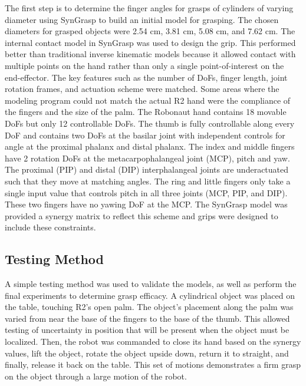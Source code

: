 \documentclass[runningheads,a4paper]{llncs}
\begin{document}
The first step is to determine the finger angles for grasps of cylinders of varying diameter using SynGrasp to build an initial model for grasping.  The chosen diameters for grasped objects were 2.54 cm, 3.81 cm, 5.08 cm, and 7.62 cm.  The internal contact model in SynGrasp was used to design the grip.  This performed better than traditional inverse kinematic models because it allowed contact with multiple points on the hand rather than only a single point-of-interest on the end-effector.  The key features such as the number of DoFs, finger length, joint rotation frames, and actuation scheme were matched.  Some areas where the modeling program could not match the actual R2 hand were the compliance of the fingers and the size of the palm.  The Robonaut hand contains 18 movable DoFs but only 12 controllable DoFs.  The thumb is fully controllable along every DoF and contains two DoFs at the basilar joint with independent controls for angle at the proximal phalanx and distal phalanx.  The index and middle fingers have 2 rotation DoFs at the metacarpophalangeal joint (MCP), pitch and yaw.  The proximal (PIP) and distal (DIP) interphalangeal joints are underactuated such that they move at matching angles.  The ring and little fingers only take a single input value that controls pitch in all three joints (MCP, PIP, and DIP).  These two fingers have no yawing DoF at the MCP.  The SynGrasp model was provided a synergy matrix to reflect this scheme and grips were designed to include these constraints. 


\subsection{Testing Method} 
A simple testing method was used to validate the models, as well as perform the final experiments to determine grasp efficacy. A cylindrical object was placed on the table, touching R2's open palm. The object's placement along the palm was varied from near the base of the fingers to the base of the thumb. This allowed testing of uncertainty in position that will be present when the object must be localized. Then, the robot was commanded to close its hand based on the synergy values, lift the object, rotate the object upside down, return it to straight, and finally, release it back on the table. This set of motions demonstrates a firm grasp on the object through a large motion of the robot. 
\end{document}
